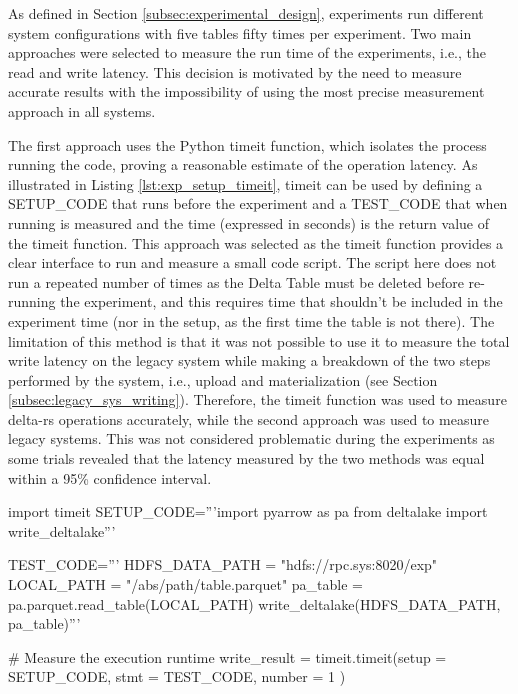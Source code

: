 As defined in Section \ref{subsec:experimental_design}, experiments run different system configurations with five tables fifty times per experiment. Two main approaches were selected to measure the run time of the experiments, i.e., the read and write latency. This decision is motivated by the need to measure accurate results with the impossibility of using the most precise measurement approach in all systems.

The first approach uses the Python timeit function, which isolates the process running the code, proving a reasonable estimate of the operation latency. As illustrated in Listing \ref{lst:exp_setup_timeit}, timeit can be used by defining a SETUP\_CODE that runs before the experiment and a TEST\_CODE that when running is measured and the time (expressed in seconds) is the return value of the timeit function. This approach was selected as the timeit function provides a clear interface to run and measure a small code script. The script here does not run a repeated number of times as the Delta Table must be deleted before re-running the experiment, and this requires time that shouldn't be included in the experiment time (nor in the setup, as the first time the table is not there). The limitation of this method is that it was not possible to use it to measure the total write latency on the legacy system while making a breakdown of the two steps performed by the system, i.e., upload and materialization (see Section \ref{subsec:legacy_sys_writing}). Therefore, the timeit function was used to measure delta-rs operations accurately, while the second approach was used to measure legacy systems. This was not considered problematic during the experiments as some trials revealed that the latency measured by the two methods was equal within a 95\% confidence interval. 

\begin{minipage}{\linewidth}
\begin{python}[caption={[Measuring latency using Timeit]Timeit usage to measure the time required to write a Delta Lake table to \gls{HopsFS}.}, label={lst:exp_setup_timeit}]
import timeit
SETUP_CODE='''import pyarrow as pa
from deltalake import write_deltalake'''
    
TEST_CODE='''
HDFS_DATA_PATH = "hdfs://rpc.sys:8020/exp" 
LOCAL_PATH = "/abs/path/table.parquet"
pa_table = pa.parquet.read_table(LOCAL_PATH)
write_deltalake(HDFS_DATA_PATH, pa_table)'''

# Measure the execution runtime
write_result = timeit.timeit(setup  = SETUP_CODE,
                             stmt   = TEST_CODE,
                             number = 1          )
\end{python}
\end{minipage}
\medskip

